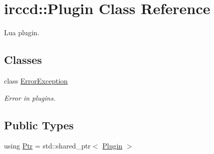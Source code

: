 \hypertarget{a00051}{\section{irccd\-:\-:Plugin Class Reference}
\label{a00051}
}


Lua plugin.  


\subsection*{Classes}
\begin{DoxyCompactItemize}
\item 
class \hyperlink{a00027}{Error\-Exception}
\begin{DoxyCompactList}\small\item\em Error in plugins. \end{DoxyCompactList}\end{DoxyCompactItemize}
\subsection*{Public Types}
\begin{DoxyCompactItemize}
\item 
using \hyperlink{a00051_ad981ef3d4a7cd70da4fffb792abcfd7c}{Ptr} = std\-::shared\-\_\-ptr$<$ \hyperlink{a00051}{Plugin} $>$
\end{DoxyCompactItemize}
